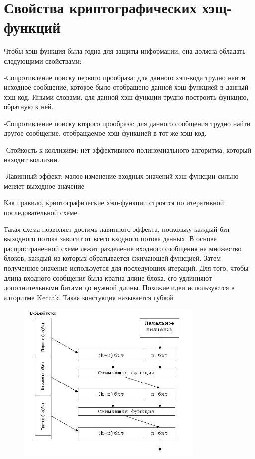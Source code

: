 \documentclass[a4paper,12pt]{article}
\theoremstyle{plain} %
\theoremstyle{definition} %
\theoremstyle{remark} %
\begin{document}
	\section{Свойства криптографических хэщ-функций}
	
	Чтобы хэш-функция была годна для защиты информации, она должна обладать следующими свойствами:
	
	-Сопротивление поиску первого прообраза: для данного хэш-кода трудно найти исходное сообщение, которое было отобращено данной хэш-функцией в данный хэш-код. Иными словами, для данной хэш-функции трудно построить функцию, обратную к ней.
	
	-Сопротивление поиску второго прообраза: для данного сообщения трудно найти другое сообщение, отобращаемое хэш-функцией в тот же хэш-код. 
	
	-Стойкость к коллизиям: нет эффективного полиномиального алгоритма, который находит коллизии.
	
	-Лавинный эффект: малое изменение входных значений хэш-функции сильно меняет выходное значение.
	
	Как правило, криптографические хэш-функции строятся по итеративной последовательной схеме. 
	
	Такая схема позволяет достичь лавинного эффекта, поскольку каждый бит выходного потока зависит от всего входного потока данных. В основе распространенной схеме лежит разделение входного сообщения на множество блоков, каждый из которых обратывается сжимающей функцией. Затем полученное значение используется для последующих итераций. Для того, чтобы длина входного сообщения была кратна длине блока, его удлинняют дополнительными битами до нужной длины. Похожие идеи используются в алгоритме Keccak. Такая констукция называется губкой.
	
	\newpage
	
	\begin{figure}[h!]
		\centering
		\includegraphics[width=90mm]{1.jpg}
	\end{figure}
	
\end{document}
